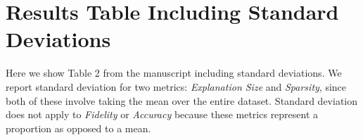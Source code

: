 
\section{Results Table Including Standard Deviations}
Here we show Table 2 from the manuscript including standard deviations. 
We report standard deviation for two metrics: \textit{Explanation Size} and \textit{Sparsity}, since both of these involve taking the mean over the entire dataset. 
Standard deviation does not apply to \textit{Fidelity} or \textit{Accuracy} because these metrics represent a proportion as opposed to a mean. 


\begin{table}[h]
\centering
\caption*{Table 2: Results comparing our method (denoted \OurShort{}) to \baserand{}, \basekeep{}, and \baserm{}. Below each metric, $\blacktriangledown$ indicates a low value is desirable, while $\blacktriangle$ indicates a high value is desirable.}
\label{table:results}
\end{table}
